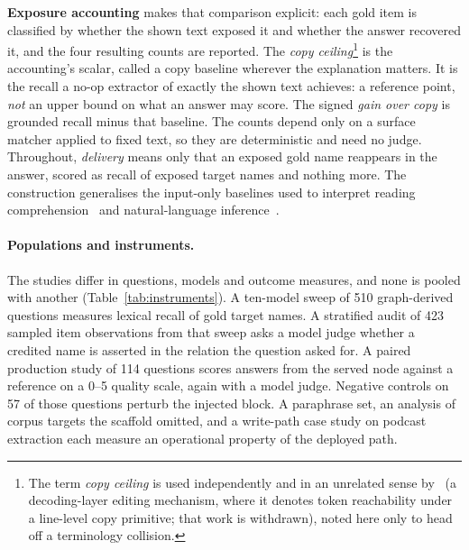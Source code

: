 \documentclass[10pt,twocolumn]{article}
\begin{document}
\textbf{Exposure accounting} makes that comparison explicit: each gold item is classified by whether the shown text exposed it and whether the answer recovered it, and the four resulting counts are reported. The \emph{copy ceiling}\footnote{The term \emph{copy ceiling} is used independently and in an unrelated sense by~\textcite{copyasdecode2026} (a decoding-layer editing mechanism, where it denotes token reachability under a line-level copy primitive; that work is withdrawn), noted here only to head off a terminology collision.} is the accounting's scalar, called a copy baseline wherever the explanation matters. It is the recall a no-op extractor of exactly the shown text achieves: a reference point, \emph{not} an upper bound on what an answer may score. The signed \emph{gain over copy} is grounded recall minus that baseline. The counts depend only on a surface matcher applied to fixed text, so they are deterministic and need no judge. Throughout, \emph{delivery} means only that an exposed gold name reappears in the answer, scored as recall of exposed target names and nothing more. The construction generalises the input-only baselines used to interpret reading comprehension~\cite{kaushik2018reading} and natural-language inference~\cite{gururangan2018artifacts,poliak2018hypothesis}.

\paragraph{Populations and instruments.} The studies differ in questions, models and outcome measures, and none is pooled with another (Table~\ref{tab:instruments}). A ten-model sweep of 510 graph-derived questions measures lexical recall of gold target names. A stratified audit of 423 sampled item observations from that sweep asks a model judge whether a credited name is asserted in the relation the question asked for. A paired production study of 114 questions scores answers from the served node against a reference on a 0--5 quality scale, again with a model judge. Negative controls on 57 of those questions perturb the injected block. A paraphrase set, an analysis of corpus targets the scaffold omitted, and a write-path case study on podcast extraction each measure an operational property of the deployed path.
\end{document}
